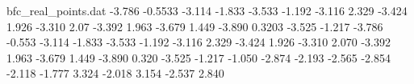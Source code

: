 \begin{filecontents}{bfc_real_points.dat}
  -3.786 -0.5533
  -3.114 -1.833
  -3.533 -1.192
  -3.116 2.329
  -3.424 1.926
  -3.310 2.07
  -3.392 1.963
  -3.679 1.449
  -3.890 0.3203
  -3.525 -1.217
  -3.786 -0.553
  -3.114 -1.833
  -3.533 -1.192
  -3.116 2.329
  -3.424 1.926
  -3.310 2.070
  -3.392 1.963
  -3.679 1.449
  -3.890 0.320
  -3.525 -1.217
  -1.050 -2.874
  -2.193 -2.565
  -2.854 -2.118
  -1.777 3.324
  -2.018 3.154
  -2.537 2.840
\end{filecontents}

